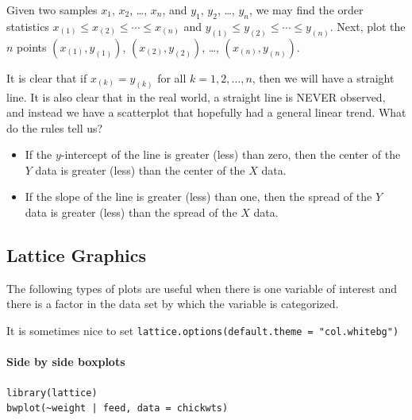 \documentclass[captions=tableheading]{scrbook}
\begin{document}
Given two samples \(x_{1}\), \(x_{2}\), \ldots{}, \(x_{n}\), and \(y_{1}\), \(y_{2}\), \ldots{}, \(y_{n}\), we may find the order statistics \(x_{(1)}\leq x_{(2)}\leq\cdots\leq x_{(n)}\) and \(y_{(1)}\leq y_{(2)}\leq\cdots\leq y_{(n)}\). Next, plot the \(n\) points \((x_{(1)},y_{(1)})\), \((x_{(2)},y_{(2)})\), \ldots{}, \((x_{(n)},y_{(n)})\).

It is clear that if \(x_{(k)}=y_{(k)}\) for all \(k=1,2,\ldots,n\), then we will have a straight line. It is also clear that in the real world, a straight line is NEVER observed, and instead we have a scatterplot that hopefully had a general linear trend. What do the rules tell us? 

\begin{itemize}
\item If the \(y\)-intercept of the line is greater (less) than zero, then the center of the \(Y\) data is greater (less) than the center of the \(X\) data.
\item If the slope of the line is greater (less) than one, then the spread of the \(Y\) data is greater (less) than the spread of the \(X\) data.
\end{itemize}
\subsection{Lattice Graphics}
\label{sec-3-6-3}

\label{sub:Lattice-Graphics}

The following types of plots are useful when there is one variable of interest and there is a factor in the data set by which the variable is categorized. 

It is sometimes nice to set \texttt{lattice.options(default.theme = "col.whitebg")}


\paragraph*{Side by side boxplots}


\begin{verbatim}
library(lattice)
bwplot(~weight | feed, data = chickwts)
\end{verbatim}
\end{document}
